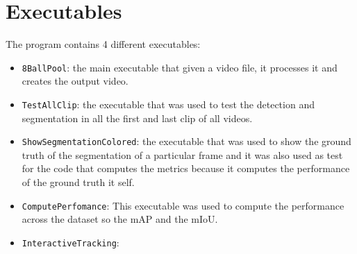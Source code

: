 \section{Executables}
The program contains 4 different executables:
\begin{itemize}
	\item \texttt{8BallPool}: the main executable that given a video file, it processes it and creates the output video.
	\item \texttt{TestAllClip}: the executable that was used to test the detection and segmentation in all the first and last clip of all videos.
	\item \texttt{ShowSegmentationColored}: the executable that was used to show the ground truth of the segmentation of a particular frame and it was also used
			as test for the code that computes the metrics because it computes the performance of the ground truth it self.
	\item \texttt{ComputePerfomance}: This executable was used to compute the performance across the dataset so the mAP and the mIoU.
	\item \texttt{InteractiveTracking}: %
\end{itemize}
